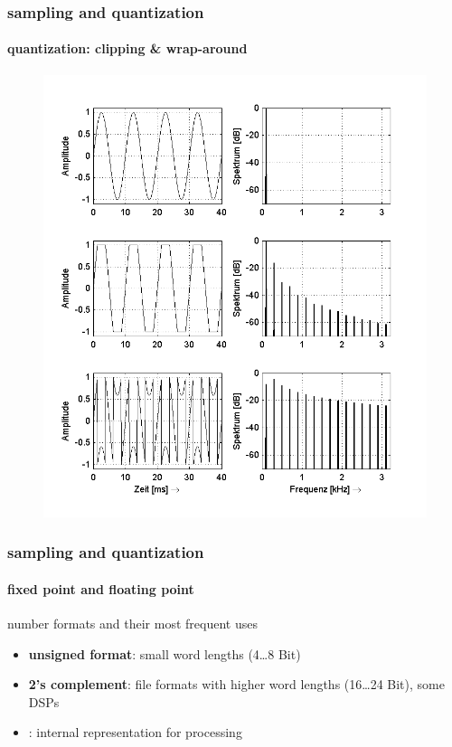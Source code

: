 	\begin{frame}\frametitle{sampling and quantization}\framesubtitle{quantization: clipping \& wrap-around}
	    \begin{figure}
	    	\centering
				\includegraphics[scale=0.5]{Graph/Lerch14-11}
		\end{figure}
	\end{frame}	
	
	\begin{frame}\frametitle{sampling and quantization}\framesubtitle{fixed point and floating point}
	
		number formats and their most frequent uses
		\begin{itemize}
			\item	\textbf{unsigned format}: small word lengths (4\ldots 8 Bit)
			\pause
			\item	\textbf{2's complement}: file formats with higher word lengths (16\ldots 24 Bit), some DSPs
			\pause
			\item	{}: internal representation for processing
		\end{itemize}
	\end{frame}	
	
